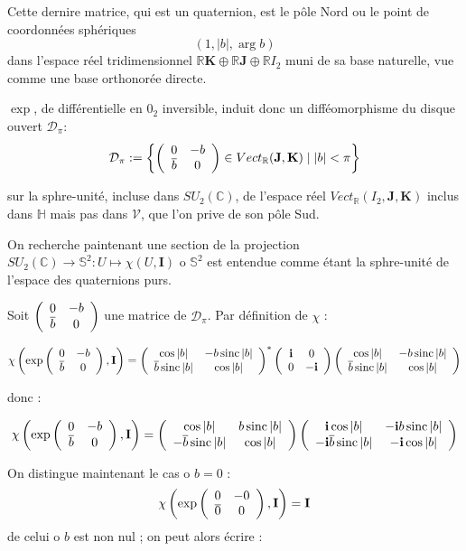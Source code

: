 Cette dernire matrice, qui est un quaternion, est le p\^ole Nord ou le point de coordonn\'ees sph\'eriques
\[(1,|b|,\arg b)\]
dans l'espace r\'eel tridimensionnel $\mathbb{R}\mathbf{K}\oplus\mathbb{R}\mathbf{J}\oplus\mathbb{R}I_2$ muni de sa base naturelle, %
vue comme une base orthonor\'ee directe.

\par
$\exp$, de diff\'erentielle en $0_2$ inversible, induit donc un diff\'eomorphisme du disque ouvert $\mathcal{D_{\pi}}$:
\[\mathcal{D_{\pi}}:=\left\{\left(\begin{array}{cc}0&-b\\\overline{b}&0\end{array}\right)\in Vect_{\mathbb{R}}(\mathbf{J},\mathbf{K})\mid |b|<\pi\right\}\]

sur la sphre-unit\'e, incluse dans $SU_2(\mathbb{C})$, de l'espace r\'eel $Vect_{\mathbb{R}}(I_2,\mathbf{J},\mathbf{K})$ inclus dans $\mathbb{H}$ mais pas dans $\mathcal{V}$, %
que l'on prive de son p\^ole Sud.


\par
On recherche paintenant une section de la projection $SU_2(\mathbb{C})\rightarrow \mathbb{S}^2 : U\mapsto \chi (U,\mathbf{I})$ %
o $\mathbb{S}^2$ est entendue comme \'etant la sphre-unit\'e de l'espace des quaternions purs.

\par
Soit $\left(\begin{array}{cc}0&-b\\\overline{b}&0\end{array}\right)$ une matrice %
de $\mathcal{D_{\pi}}$. Par d\'efinition de $\chi$ :

\begin{equation}
\chi\left(\exp\mcd{0}{-b}{\overline{b}}{0},\mathbf{I}\right)=\mcd{\cos |b|}{-b\sinc |b|}{\overline{b}\sinc |b|}{\cos|b|}^{\ast}%
\mcd{\mathbf{i}}{0}{0}{-\mathbf{i}}\mcd{\cos |b|}{-b\sinc |b|}{\overline{b}\sinc |b|}{\cos|b|}
\end{equation}

donc :

\begin{equation}
\chi\left(\exp\mcd{0}{-b}{\overline{b}}{0},\mathbf{I}\right)=%
\mcd{\cos |b|}{b\sinc |b|}{-\overline{b}\sinc |b|}{\cos|b|}%
\mcd{\mathbf{i}\cos |b|}{-\mathbf{i}b\sinc |b|}{-\mathbf{i}\overline{b}\sinc |b|}{-\mathbf{i}\cos|b|}
\end{equation}

On distingue maintenant le cas o $b=0$ : \[\chi \left(\exp\left(\begin{array}{cc}0&-0\\\overline{0}&0\end{array}\right),\mathbf{I}\right)=\mathbf{I}\]
de celui o $b$ est non nul ; on peut alors \'ecrire :

